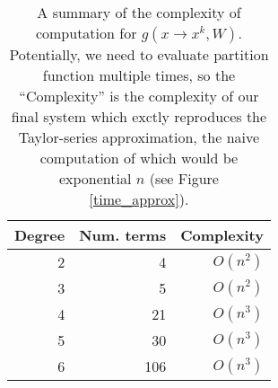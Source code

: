 \begin{table}[t]
\tiny
\centering
\begin{tabular}{rrr}
\hline
Degree & Num. terms & Complexity \\
\hline
2 & 4 & $O(n^2)$\\
3 & 5 & $O(n^2)$\\
4 & 21 & $O(n^3)$\\
5 & 30 & $O(n^3)$\\
6 & 106 & $O(n^3)$\\
\hline
\end{tabular}
\caption{A summary of the complexity of computation for $g(x \rightarrow x^k, W)$.
  Potentially, we need to evaluate partition function multiple times, so the ``Complexity''
  is the complexity of our final system which exctly reproduces the
  Taylor-series approximation, the naive computation of which would be
  exponential $n$ (see Figure \ref{time_approx}).} 
\label{eval}
\vspace{-4mm}
\end{table}

